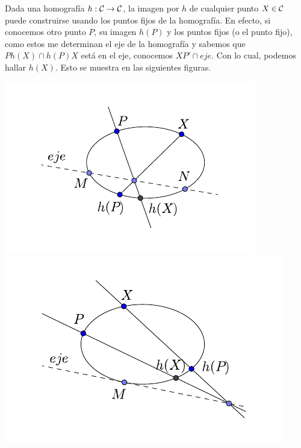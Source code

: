 \begin{obs}
	Dada una homografía $h:\mathcal{C}\rightarrow\mathcal{C}$, la imagen por $h$ de cualquier punto $X\in\mathcal{C}$ puede construirse usando los puntos fijos de la homografía. En efecto, si conocemos otro punto $P$, su imagen $h(P)$ y los puntos fijos (o el punto fijo), como estos me determinan el eje de la homografía y sabemos que $Ph(X)\cap h(P)X$ está en el eje, conocemos $XP'\cap eje$. Con lo cual, podemos hallar $h(X)$. Esto se muestra en las siguientes figuras.
	\begin{center}
		\includegraphics[scale=1]{Graficos/Conicas/TeoremaDelEje1} \
		\includegraphics[scale=.9]{Graficos/Conicas/TeoremaDelEje2}
	\end{center}
\end{obs}